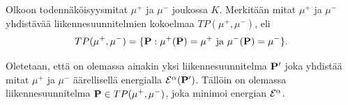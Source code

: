 \documentclass[12pt,oneside,a4paper]{amsbook} %
\begin{document}
\begin{theorem}
    Olkoon todennäköisyysmitat $\mu^+$ ja $\mu^-$ joukossa $K $. Merkitään mitat $\mu^+$ ja $\mu^-$ yhdistävää liikennesuunnitelmien kokoelmaa $TP(\mu^+, \mu^-)$, eli
    \begin{align*}
        TP(\mu^+, \mu^-) = \{\P : \mu^+(\P) = \mu^+ \text{ ja }\mu^-(\P) = \mu^-\}.
    \end{align*}
    
    Oletetaan, että on olemassa ainakin yksi liikennesuunnitelma $\P'$ joka yhdistää mitat $\mu^+$ ja $\mu^-$ äärellisellä energialla $\E^\alpha(\P')$. Tällöin on olemassa liikennesuunnitelma $\P \in TP(\mu^+, \mu^-)$, joka minimoi energian $\E^\alpha$.
    
\end{theorem}
\end{document}
